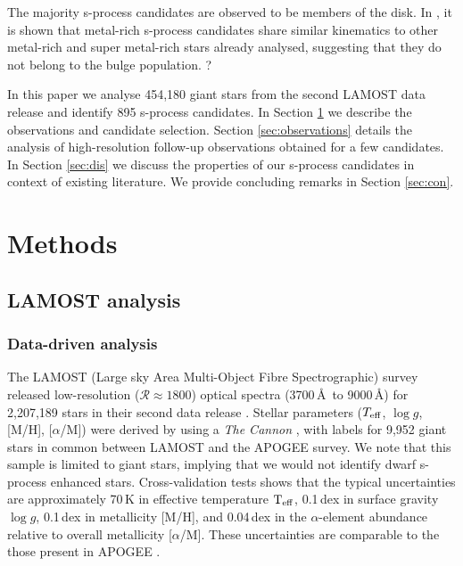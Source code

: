 \documentclass[a4paper,fleqn,usenatbib]{mnras}
\begin{document}
The majority s-process candidates are observed to be members of the disk\citep{jorissen1993,gomez1997,mennessier1997}. In \citet{pereira2011}, it is shown that metal-rich s-process candidates share similar kinematics to other metal-rich and super metal-rich stars already analysed, suggesting that they do not belong to the bulge population. \cite{jorissen1993} ?

In this paper we analyse 454,180 giant stars from the second LAMOST data release \citep{luo2015} and identify 895 s-process candidates. In Section \ref{sec:methods} we describe the observations and candidate selection. Section \ref{sec:observations} details the analysis of high-resolution follow-up observations obtained for a few candidates. In Section \ref{sec:dis} we discuss the properties of our s-process candidates in context of existing literature. We provide concluding remarks in Section \ref{sec:con}.


\section{Methods} \label{sec:methods}
\subsection{LAMOST analysis}
\subsubsection{Data-driven analysis}
The LAMOST (Large sky Area Multi-Object Fibre Spectrographic) survey released low-resolution ($\mathcal{R} \approx 1800$) optical spectra (3700\,\AA\ to 9000\,\AA) for 2,207,189 stars in their second data release \citep{luo2015}. Stellar parameters ($T_{\rm eff}$, $\log{g}$, [M/H], [$\alpha$/M]) were derived by \citep{ho2017} using a \emph{The Cannon} \citet{ness2016}, with labels for 9,952 giant stars in common between LAMOST and the APOGEE survey. We note that this sample is limited to giant stars, implying that we would not identify dwarf s-process enhanced stars. Cross-validation tests shows that the typical uncertainties are approximately 70\,K in effective temperature $\rm T_{\rm eff}$, 0.1\,dex in surface gravity $\log{g}$, 0.1\,dex in metallicity [M/H], and 0.04\,dex in the $\alpha$-element abundance relative to overall metallicity [$\alpha$/M]. These uncertainties are comparable to the those present in APOGEE \citep{alam2015}.
\end{document}
